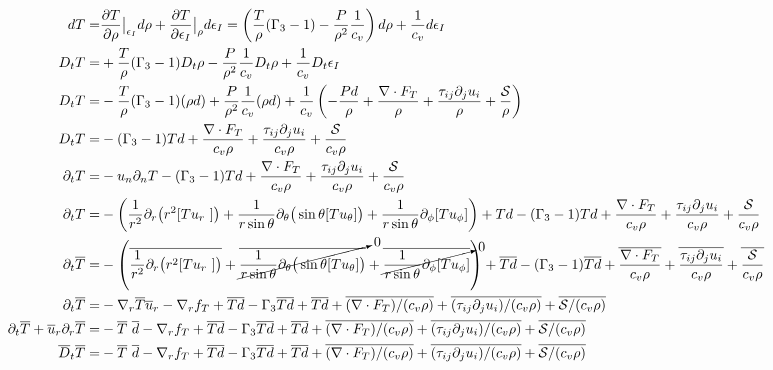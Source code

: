 \documentclass[10pt,paper=a4]{report}
\newcommand{\eht}{\overline}
\begin{document}
\begin{align}
dT = & \frac{\partial T}{\partial \rho}\big|_{\epsilon_I} d\rho + \frac{\partial T}{\partial \epsilon_I}\big|_\rho d\epsilon_I = \left( \frac{T}{\rho}(\Gamma_3 -1) - \frac{P}{\rho^2}\frac{1}{c_v} \right) d\rho + \frac{1}{c_v} d\epsilon_I \\
D_t T = & +\frac{T}{\rho}(\Gamma_3 -1) D_t\rho - \frac{P}{\rho^2}\frac{1}{c_v} D_t \rho + \frac{1}{c_v} D_t \epsilon_I \\
D_t T = & -\frac{T}{\rho}(\Gamma_3 -1)(\rho d) + \frac{P}{\rho^2}\frac{1}{c_v}(\rho d) + \frac{1}{c_v}\left(-\frac{Pd}{\rho} + \frac{\nabla \cdot F_T}{\rho} + \frac{\tau_{ij}\partial_j u_i}{\rho} + \frac{{\mathcal S}}{\rho} \right) \\
D_t T = & -(\Gamma_3 -1)Td + \frac{\nabla \cdot F_T}{c_v \rho} + \frac{\tau_{ij}\partial_j u_i}{c_v \rho} + \frac{{\mathcal S}}{c_v \rho} \\
\partial_t T = & -u_n \partial_n T  -(\Gamma_3 -1)Td + \frac{\nabla \cdot F_T}{c_v \rho} + \frac{\tau_{ij}\partial_j u_i}{c_v \rho} + \frac{{\mathcal S}}{c_v \rho} \\
\partial_t T = & -\left( \frac{1}{r^{2}}\partial_{r}\big(r^{2}[T u_{r}~]\big) + \frac{1}{r\sin{\theta}}\partial_{\theta} \big(\sin{\theta} [T u_{\theta}]\big) + \frac{1}{r\sin{\theta}}\partial_{\phi} [T u_{\phi}] \right) + Td  -(\Gamma_3 -1)Td + \frac{\nabla \cdot F_T}{c_v \rho} + \frac{\tau_{ij}\partial_j u_i}{c_v \rho} + \frac{{\mathcal S}}{c_v \rho} \\
\partial_t \eht{T} = & -\left( \eht{\frac{1}{r^{2}}\partial_{r}\big(r^{2}[T u_{r}~]\big)} + \cancelto{0}{\eht{\frac{1}{r\sin{\theta}}\partial_{\theta} \big(\sin{\theta} [T u_{\theta}]\big)}} + \cancelto{0}{\eht{\frac{1}{r\sin{\theta}}\partial_{\phi} [T u_{\phi}]}} \right) + \eht{Td}  -(\Gamma_3 -1)\eht{Td} + \eht{\frac{\nabla \cdot F_T}{c_v \rho}} + \eht{\frac{\tau_{ij}\partial_j u_i}{c_v \rho}} + \eht{\frac{{\mathcal S}}{c_v \rho}} \\
\partial_t \eht{T} = & -\nabla_r \eht{T}\eht{u}_r -\nabla_r f_T + \eht{Td}  -\Gamma_3 \eht{Td} + \eht{Td} + \eht{(\nabla \cdot F_T)/(c_v \rho)} + \eht{(\tau_{ij}\partial_j u_i)/(c_v \rho)} + \eht{{\mathcal S}/(c_v \rho)} \\
\partial_t \eht{T} + \eht{u}_r \partial_r \eht{T} = & -\eht{T}\ \eht{d} -\nabla_r f_T + \eht{Td}  -\Gamma_3 \eht{Td} + \eht{Td} + \eht{(\nabla \cdot F_T)/(c_v \rho)} + \eht{(\tau_{ij}\partial_j u_i)/(c_v \rho)} + \eht{{\mathcal S}/(c_v \rho)} \\
\eht{D}_t \eht{T} = & -\eht{T}\ \eht{d} -\nabla_r f_T + \eht{Td}  -\Gamma_3 \eht{Td} + \eht{Td} + \eht{(\nabla \cdot F_T)/(c_v \rho)} + \eht{(\tau_{ij}\partial_j u_i)/(c_v \rho)} + \eht{{\mathcal S}/(c_v \rho)} \\

\end{align}
\end{document}
